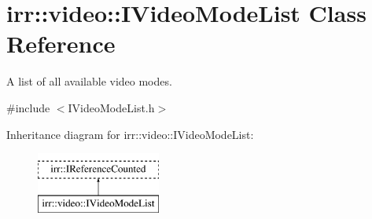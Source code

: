 \hypertarget{classirr_1_1video_1_1IVideoModeList}{}\section{irr\+:\+:video\+:\+:I\+Video\+Mode\+List Class Reference}
\label{classirr_1_1video_1_1IVideoModeList}


A list of all available video modes.  




{\ttfamily \#include $<$I\+Video\+Mode\+List.\+h$>$}

Inheritance diagram for irr\+:\+:video\+:\+:I\+Video\+Mode\+List\+:\begin{figure}[H]
\begin{center}
\leavevmode
\includegraphics[height=2.000000cm]{classirr_1_1video_1_1IVideoModeList}
\end{center}
\end{figure}
